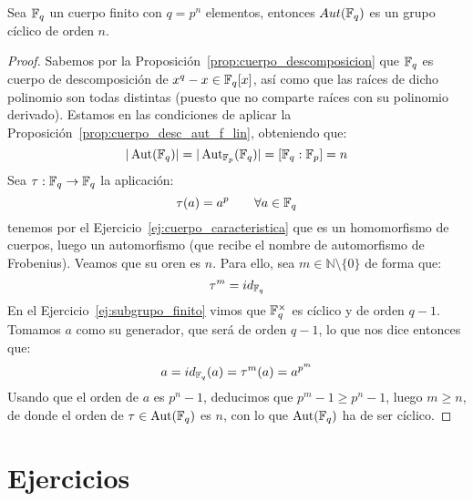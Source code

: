 \begin{teo}
    Sea $\mathbb{F}_q$ un cuerpo finito con $q=p^n$ elementos, entonces $Aut(\mathbb{F}_q)$ es un grupo cíclico de orden $n$.
    \begin{proof}
        Sabemos por la Proposición~\ref{prop:cuerpo_descomposicion} que $\mathbb{F}_q$ es cuerpo de descomposición de $x^q-x\in \mathbb{F}_q[x]$, así como que las raíces de dicho polinomio son todas distintas (puesto que no comparte raíces con su polinomio derivado). Estamos en las condiciones de aplicar la Proposición~\ref{prop:cuerpo_desc_aut_f_lin}, obteniendo que:
        \begin{equation*}
            |\operatorname{Aut}(\mathbb{F}_q)| = |\operatorname{Aut}_{\mathbb{F}_p}(\mathbb{F}_q)| = [\mathbb{F}_q : \mathbb{F}_p] = n
        \end{equation*}
        Sea $\tau:\mathbb{F}_q\to \mathbb{F}_q$ la aplicación:
        \begin{equation*}
            \tau(a) = a^{p} \qquad \forall a\in \mathbb{F}_q
        \end{equation*}
        tenemos por el Ejercicio~\ref{ej:cuerpo_caracteristica} que es un homomorfismo de cuerpos, luego un automorfismo (que recibe el nombre de automorfismo de Frobenius). Veamos que su oren es $n$. Para ello, sea $m\in \mathbb{N}\setminus \{0\}$ de forma que:
        \begin{equation*}
            \tau^m = id_{\mathbb{F}_q}
        \end{equation*}
        En el Ejercicio~\ref{ej:subgrupo_finito} vimos que $\mathbb{F}_q^{\times}$ es cíclico y de orden $q-1$. Tomamos $a$ como su generador, que será de orden $q-1$, lo que nos dice entonces que:
        \begin{equation*}
            a = id_{\mathbb{F}_q}(a) = \tau^m (a)  = a^{p^m}
        \end{equation*}
        Usando que el orden de $a$ es $p^n-1$, deducimos que $p^m -1\geq p^n -1$, luego $m\geq n$, de donde el orden de $\tau\in \operatorname{Aut}(\mathbb{F}_q)$ es $n$, con lo que $\operatorname{Aut}(\mathbb{F}_q)$ ha de ser cíclico.
    \end{proof}
\end{teo}

\section{Ejercicios}

